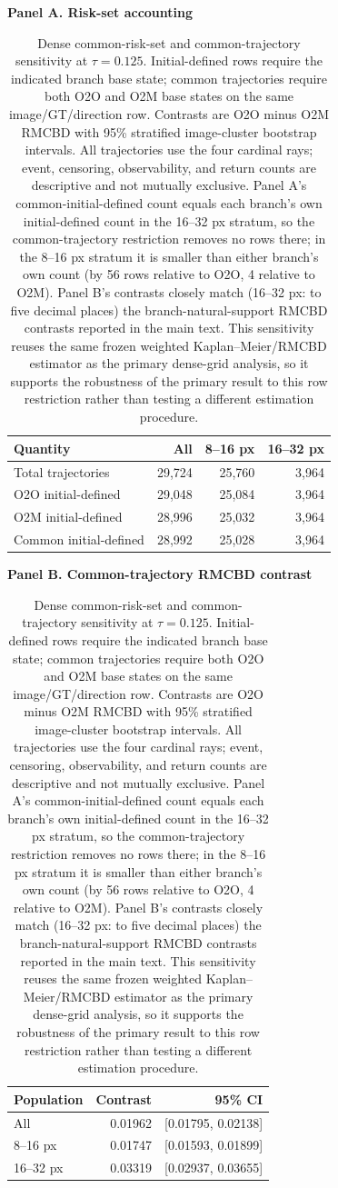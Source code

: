 \begin{table}[ht]
\centering
\scriptsize
\caption{Dense common-risk-set and common-trajectory sensitivity at $\tau=0.125$. Initial-defined rows require the indicated branch base state; common trajectories require both O2O and O2M base states on the same image/GT/direction row. Contrasts are O2O minus O2M RMCBD with 95\% stratified image-cluster bootstrap intervals. All trajectories use the four cardinal rays; event, censoring, observability, and return counts are descriptive and not mutually exclusive. Panel A's common-initial-defined count equals each branch's own initial-defined count in the 16--32 px stratum, so the common-trajectory restriction removes no rows there; in the 8--16 px stratum it is smaller than either branch's own count (by 56 rows relative to O2O, 4 relative to O2M). Panel B's contrasts closely match (16--32 px: to five decimal places) the branch-natural-support RMCBD contrasts reported in the main text. This sensitivity reuses the same frozen weighted Kaplan--Meier/RMCBD estimator as the primary dense-grid analysis, so it supports the robustness of the primary result to this row restriction rather than testing a different estimation procedure.}
\label{tab:dense_common_sensitivity}
\textbf{Panel A. Risk-set accounting}
\begin{tabularx}{\textwidth}{@{}lrrr@{}}
\toprule
Quantity & All & 8--16 px & 16--32 px \\
\midrule
Total trajectories & 29,724 & 25,760 & 3,964 \\
O2O initial-defined & 29,048 & 25,084 & 3,964 \\
O2M initial-defined & 28,996 & 25,032 & 3,964 \\
Common initial-defined & 28,992 & 25,028 & 3,964 \\
\bottomrule
\end{tabularx}
\medskip
\textbf{Panel B. Common-trajectory RMCBD contrast}
\begin{tabularx}{\textwidth}{@{}lrr@{}}
\toprule
Population & Contrast & 95\% CI \\
\midrule
All & 0.01962 & [0.01795, 0.02138] \\
8--16 px & 0.01747 & [0.01593, 0.01899] \\
16--32 px & 0.03319 & [0.02937, 0.03655] \\
\bottomrule
\end{tabularx}
\end{table}
